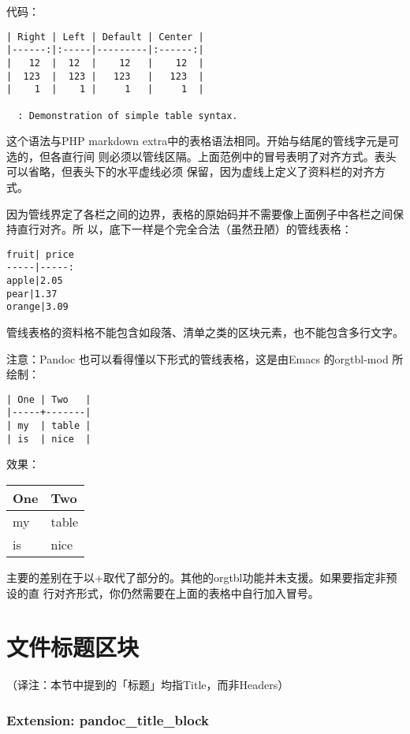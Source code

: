 \documentclass[fancyhdr,bookmark]{ctexbook}
\begin{document}
代码：

\begin{lstlisting}
| Right | Left | Default | Center |
|------:|:-----|---------|:------:|
|   12  |  12  |    12   |    12  |
|  123  |  123 |   123   |   123  |
|    1  |    1 |     1   |     1  |

  : Demonstration of simple table syntax.
\end{lstlisting}

这个语法与PHP markdown
extra中的表格语法相同。开始与结尾的管线字元是可选的，但各直行间
则必须以管线区隔。上面范例中的冒号表明了对齐方式。表头可以省略，但表头下的水平虚线必须
保留，因为虚线上定义了资料栏的对齐方式。

因为管线界定了各栏之间的边界，表格的原始码并不需要像上面例子中各栏之间保持直行对齐。所
以，底下一样是个完全合法（虽然丑陋）的管线表格：

\begin{lstlisting}
fruit| price
-----|-----:
apple|2.05
pear|1.37
orange|3.09
\end{lstlisting}

管线表格的资料格不能包含如段落、清单之类的区块元素，也不能包含多行文字。

注意：Pandoc 也可以看得懂以下形式的管线表格，这是由Emacs 的orgtbl-mod
所绘制：

\begin{lstlisting}
| One | Two   |
|-----+-------|
| my  | table |
| is  | nice  |
\end{lstlisting}

效果：

\begin{longtable}[c]{@{}ll@{}}
\toprule
One & Two\tabularnewline
\midrule
\endhead
my & table\tabularnewline
is & nice\tabularnewline
\bottomrule
\end{longtable}

主要的差别在于以+取代了部分的\textbar{}。其他的orgtbl功能并未支援。如果要指定非预设的直
行对齐形式，你仍然需要在上面的表格中自行加入冒号。

\section{文件标题区块}\label{ux6587ux4ef6ux6807ux9898ux533aux5757}

（译注：本节中提到的「标题」均指Title，而非Headers）

\subsubsection{Extension:
pandoc\_title\_block}\label{extension-pandocux5ftitleux5fblock}
\end{document}
